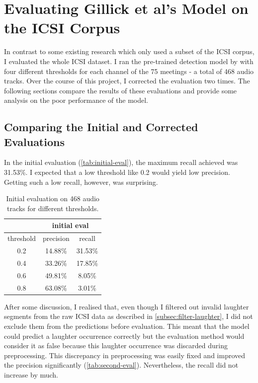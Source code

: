 \documentclass[bsc,frontabs,parskip,deptreport]{infthesis}
\begin{document}
\section{Evaluating Gillick et al's Model on the ICSI Corpus}
In contrast to some existing research \citep{kennedy2004laughter, knox2006automatic} which only used a subset of the ICSI corpus, I evaluated the whole ICSI dataset.
I ran the pre-trained detection model by \citet{gillick2021robust} with four different thresholds for each channel of the 75 meetings - a total of 468 audio tracks. 
Over the course of this project, I corrected the evaluation two times.
The following sections compare the results of these evaluations and provide some analysis on the poor performance of the model.

\subsection{Comparing the Initial and Corrected Evaluations}
In the initial evaluation (\autoref{tab:initial-eval}), the maximum recall achieved was 31.53\%. I expected that a low threshold like 0.2 would yield low precision. Getting such a low recall, however, was surprising. 
\begin{table}[h!]
    \centering
    \begin{tabular}{|c|c|c|}
    \hline
    & \multicolumn{2}{|c|}{initial eval} \\ 
    \hline 
    threshold & precision & recall \\
    \hline
        0.2 &  14.88\% & 31.53\% \\ 
        0.4 &  33.26\% & 17.85\% \\
        0.6 &  49.81\% & 8.05\%  \\
        0.8 &  63.08\% & 3.01\%  \\
     \hline
    \end{tabular}
    \caption{Initial evaluation on 468 audio tracks for different thresholds.}
    \label{tab:initial-eval}
\end{table}



After some discussion, I realised that, even though I filtered out invalid laughter segments from the raw ICSI data as described in \autoref{subsec:filter-laughter}, I did not exclude them from the predictions before evaluation. 
This meant that the model could predict a laughter occurrence correctly but the evaluation method would consider it as false because this laughter occurrence was discarded during preprocessing.
This discrepancy in preprocessing was easily fixed and improved the precision significantly (\autoref{tab:second-eval}). Nevertheless, the recall did not increase by much. 
\end{document}
